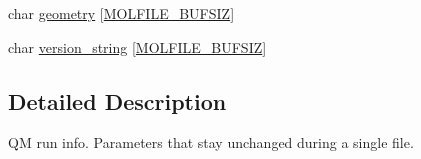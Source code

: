 \begin{DoxyCompactItemize}
\item 
char \hyperlink{structmolfile__qm__sysinfo__t_a321d21921b2358bf642687935a8e3a07}{geometry} \mbox{[}\hyperlink{molfile__plugin_8h_adb121359484e3cbc0e035963e95ec867}{\-M\-O\-L\-F\-I\-L\-E\-\_\-\-B\-U\-F\-S\-I\-Z}\mbox{]}
\item 
char \hyperlink{structmolfile__qm__sysinfo__t_a3944fa2befabe29da4c5fadc3b0bb733}{version\-\_\-string} \mbox{[}\hyperlink{molfile__plugin_8h_adb121359484e3cbc0e035963e95ec867}{\-M\-O\-L\-F\-I\-L\-E\-\_\-\-B\-U\-F\-S\-I\-Z}\mbox{]}
\end{DoxyCompactItemize}


\subsection{\-Detailed \-Description}
\-Q\-M run info. \-Parameters that stay unchanged during a single file. 

